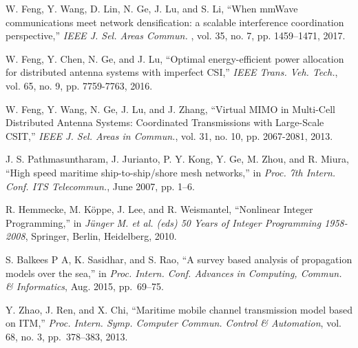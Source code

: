 \documentclass[conference]{IEEEtran}
\begin{document}
\begin{thebibliography}{10}
  W. Feng, Y. Wang, D. Lin, N. Ge, J. Lu, and S. Li, ``When mmWave communications meet network densification: a scalable interference coordination perspective,''
  \emph{IEEE J. Sel. Areas Commun. }, vol. 35, no. 7, pp. 1459--1471, 2017.

  W. Feng, Y. Chen, N. Ge, and J. Lu, ``Optimal energy-efficient power allocation for distributed antenna systems with imperfect CSI,''
  \emph{IEEE Trans. Veh. Tech.}, vol. 65, no. 9, pp. 7759-7763, 2016.

  W. Feng, Y. Wang, N. Ge, J. Lu, and J. Zhang, ``Virtual MIMO in Multi-Cell Distributed Antenna Systems: Coordinated Transmissions with Large-Scale CSIT,'' 
  \emph{IEEE J. Sel. Areas in Commun.}, vol. 31, no. 10, pp. 2067-2081, 2013.


  J. S. Pathmasuntharam, J. Jurianto, P. Y. Kong, Y. Ge, M. Zhou, and R. Miura, ``High speed maritime ship-to-ship/shore mesh networks,'' in
  \emph{Proc. 7th Intern. Conf. ITS Telecommun.}, June 2007, pp. 1--6.


  R. Hemmecke, M. Köppe, J. Lee, and R. Weismantel, ``Nonlinear Integer Programming,'' in
  \emph{Jünger M. et al. (eds) 50 Years of Integer Programming 1958-2008}, Springer, Berlin, Heidelberg, 2010.


  


S. Balkees P A, K. Sasidhar, and S. Rao, ``A survey based analysis of propagation models over the sea,'' in
\emph{Proc. Intern. Conf. Advances in Computing, Commun. \& Informatics}, Aug. 2015, pp.~69--75.

Y. Zhao, J. Ren, and X. Chi, ``Maritime mobile channel transmission model based on ITM,''
\emph{Proc. Intern. Symp. Computer Commun. Control \& Automation}, vol. 68, no. 3, pp.~378--383, 2013.


\end{thebibliography}
\end{document}

